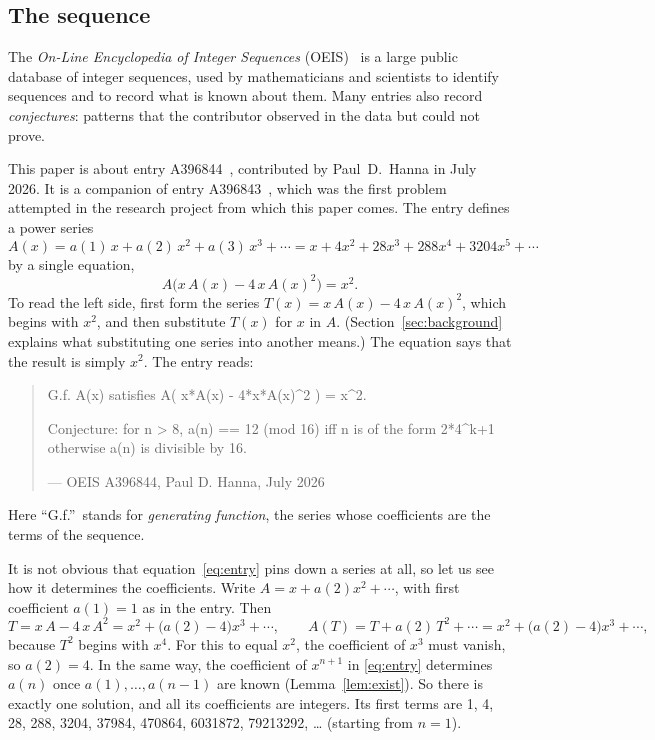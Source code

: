 \documentclass[11pt,a4paper]{article}
\theoremstyle{definition}
\theoremstyle{remark}
\begin{document}
\subsection{The sequence}\label{sec:sequence}
The \emph{On-Line Encyclopedia of Integer Sequences} (OEIS)~\cite{oeisdb} is a large public database of integer
sequences, used by mathematicians and scientists to identify sequences and to record what is known about them. Many
entries also record \emph{conjectures}: patterns that the contributor observed in the data but could not prove.

This paper is about entry A396844~\cite{oeis4}, contributed by Paul~D.~Hanna in July 2026.
It is a companion of entry A396843~\cite{oeis3}, which was the first problem attempted in the research
project from which this paper comes.
The entry defines a power series
\[
A(x)=a(1)\,x+a(2)\,x^2+a(3)\,x^3+\cdots=x+4x^2+28x^3+288x^4+3204x^5+\cdots
\]
by a single equation,
\begin{equation}\label{eq:entry}
A\bigl(x\,A(x)-4\,x\,A(x)^2\bigr)=x^2 .
\end{equation}
To read the left side, first form the series $T(x)=x\,A(x)-4\,x\,A(x)^2$, which begins with $x^2$, and
then substitute $T(x)$ for $x$ in $A$. (Section~\ref{sec:background} explains what substituting one series into another
means.) The equation says that the result is simply $x^2$. The entry reads:
\begin{quote}\small\ttfamily\raggedright G.f. A(x) satisfies A( x*A(x) - 4*x*A(x)\^{}2 ) = x\^{}2.\par\smallskip Conjecture: for n > 8, a(n) == 12 (mod 16) iff n is of the form 2*4\^{}k+1 otherwise a(n) is divisible by 16.\par\smallskip\hfill\textrm{--- OEIS A396844, Paul D. Hanna, July 2026}\end{quote}

Here ``G.f.''\ stands for \emph{generating function}, the series whose coefficients are the terms of the sequence.

It is not obvious that equation~\eqref{eq:entry} pins down a series at all, so let us see how it determines the
coefficients. Write $A=x+a(2)x^2+\cdots$, with first coefficient $a(1)=1$ as in the entry. Then
\[
T=x\,A-4\,x\,A^2=x^2+\bigl(a(2)-4\bigr)x^3+\cdots,
\qquad
A(T)=T+a(2)\,T^2+\cdots=x^2+\bigl(a(2)-4\bigr)x^3+\cdots,
\]
because $T^2$ begins with $x^4$. For this to equal $x^2$, the coefficient of $x^3$ must vanish, so
$a(2)=4$. In the same way, the coefficient of $x^{n+1}$ in \eqref{eq:entry} determines $a(n)$ once
$a(1),\dots,a(n-1)$ are known (Lemma~\ref{lem:exist}). So there is exactly one solution, and all its coefficients are
integers. Its first terms are 1, 4, 28, 288, 3204, 37984, 470864, 6031872, 79213292, \dots{} (starting from $n=1$).
\end{document}
